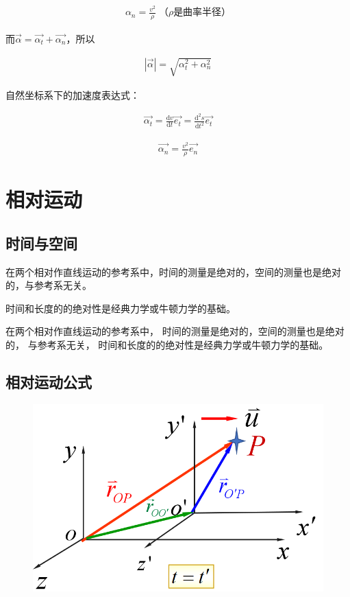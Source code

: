 \documentclass[
	12pt, %
	a4paper, %
]{myLegrandOrangeBook}
\newcommand{\rmd}{\mathrm{d}}
\newcommand{\deriv}[2]{\frac{\rmd #1}{\rmd #2}}
\begin{document}
    \begin{align}
        \alpha_n = \frac{v^2}{\rho}\; \text{（\(\rho\)是曲率半径）}
    \end{align}

    而\(\overrightarrow{\alpha} = \overrightarrow{\alpha_t} + \overrightarrow{\alpha_n}\)，所以

    \begin{align}
        \left|\overrightarrow{\alpha}\right| = \sqrt{\alpha_t^2 + \alpha_n^2}
    \end{align}

    自然坐标系下的加速度表达式：
    
    \begin{align}
        \overrightarrow{\alpha_t} = \deriv{v}{t} \overrightarrow{e_t} =
        \frac{\rmd^2 s}{\rmd t^2} \overrightarrow{e_t}
    \end{align}

    \begin{align}
        \overrightarrow{\alpha_n} = \frac{v^2}{\rho} \overrightarrow{e_n}
    \end{align}

\section{相对运动}

\subsection{时间与空间}

    在两个相对作直线运动的参考系中，时间的测量是绝对的，空间的测量也是绝对的，与参考系无关。

    时间和长度的的绝对性是经典力学或牛顿力学的基础。

    在两个相对作直线运动的参考系中， 时间的测量是绝对的，空间的测量也是绝对的， 与参考系无关， 时间和长度的的绝对性是经典力学或牛顿力学的基础。

\subsection{相对运动公式}

    \begin{figure}
        \centering
        \includegraphics[scale=0.3]{"Chapter 01 images/pic8.png"}
        \label{pic8}
    \end{figure}
\end{document}
